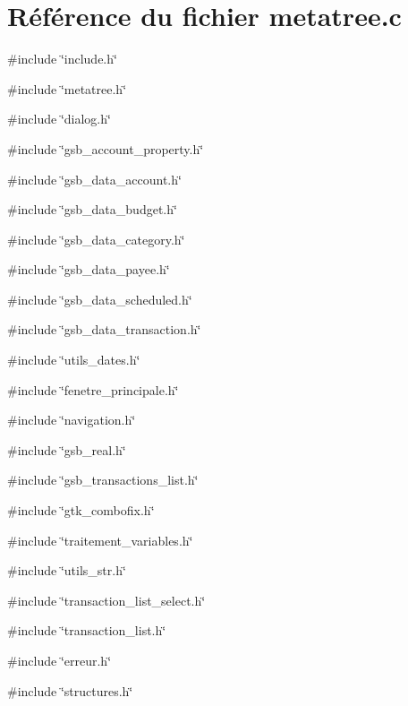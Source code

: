 \section{Référence du fichier metatree.c}
\label{metatree_8c}
{\ttfamily \#include \char`\"{}include.h\char`\"{}}\par
{\ttfamily \#include \char`\"{}metatree.h\char`\"{}}\par
{\ttfamily \#include \char`\"{}dialog.h\char`\"{}}\par
{\ttfamily \#include \char`\"{}gsb\_\-account\_\-property.h\char`\"{}}\par
{\ttfamily \#include \char`\"{}gsb\_\-data\_\-account.h\char`\"{}}\par
{\ttfamily \#include \char`\"{}gsb\_\-data\_\-budget.h\char`\"{}}\par
{\ttfamily \#include \char`\"{}gsb\_\-data\_\-category.h\char`\"{}}\par
{\ttfamily \#include \char`\"{}gsb\_\-data\_\-payee.h\char`\"{}}\par
{\ttfamily \#include \char`\"{}gsb\_\-data\_\-scheduled.h\char`\"{}}\par
{\ttfamily \#include \char`\"{}gsb\_\-data\_\-transaction.h\char`\"{}}\par
{\ttfamily \#include \char`\"{}utils\_\-dates.h\char`\"{}}\par
{\ttfamily \#include \char`\"{}fenetre\_\-principale.h\char`\"{}}\par
{\ttfamily \#include \char`\"{}navigation.h\char`\"{}}\par
{\ttfamily \#include \char`\"{}gsb\_\-real.h\char`\"{}}\par
{\ttfamily \#include \char`\"{}gsb\_\-transactions\_\-list.h\char`\"{}}\par
{\ttfamily \#include \char`\"{}gtk\_\-combofix.h\char`\"{}}\par
{\ttfamily \#include \char`\"{}traitement\_\-variables.h\char`\"{}}\par
{\ttfamily \#include \char`\"{}utils\_\-str.h\char`\"{}}\par
{\ttfamily \#include \char`\"{}transaction\_\-list\_\-select.h\char`\"{}}\par
{\ttfamily \#include \char`\"{}transaction\_\-list.h\char`\"{}}\par
{\ttfamily \#include \char`\"{}erreur.h\char`\"{}}\par
{\ttfamily \#include \char`\"{}structures.h\char`\"{}}\par
